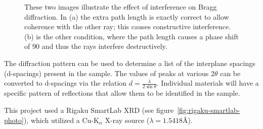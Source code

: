 \begin{figure}[tbp]
   \centering
	\hspace{0.5cm}
   \caption[Illustration of Bragg's Law]%
   		{These two images illustrate the effect of interference on Bragg diffraction. In (a) the extra %
		path length is exactly correct to allow coherence with the other ray; this causes constructive %
		interference. (b) is the other condition, where the path length causes a phase shift of 90\Deg{}%
		and thus the rays interfere destructively.}
   \label{fig:braggs-law}
\end{figure}

The diffraction pattern can be used to determine a list of the interplane spacings (d-spacings) present in the sample. The values of peaks at various 2$\theta$ can be converted to d-spacings via the relation $d=\frac{\lambda}{2\sin\theta}$. Individual materials will have a specific pattern of reflections that allow them to be identified in the sample. 

This project used a Rigaku SmartLab XRD (see figure~\vref{fig:rigaku-smartlab-photo}), which utilized a Cu-K$_{\alpha}$ X-ray source ($\lambda = 1.5418$\AA).

